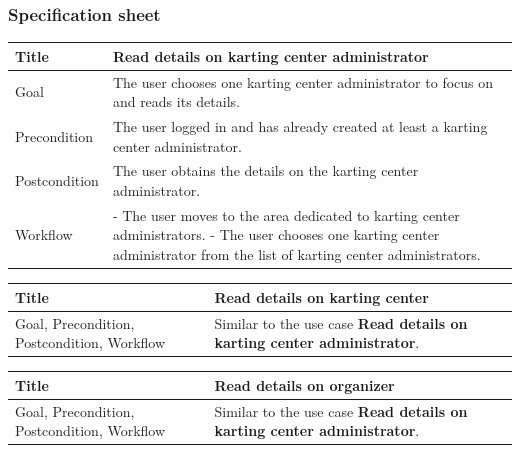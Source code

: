 \documentclass{beamer}
\begin{document}
\begin{frame}
    \frametitle{Specification sheet}
    \begin{table}
        \tiny
        \begin{tabular}{|p{2cm}|p{6cm}|}
        \hline  
        Title & \textbf{Read details on karting center administrator} \\
        \hline
        Goal & The user chooses one karting center administrator to focus on and reads its details. \\
        \hline
        Precondition & The user logged in and has already created at least a karting center 
        administrator. \\
        \hline
        Postcondition & The user obtains the details on the karting center administrator. \\
        \hline
        Workflow &
        - The user moves to the area dedicated to karting center administrators. \newline
        - The user chooses one karting center administrator from the 
        list of karting center administrators. \\
        \hline
        \end{tabular}
\end{table}

\begin{table}
    \tiny
    \begin{tabular}{|p{2cm}|p{6cm}|}
    \hline  
    Title & \textbf{Read details on karting center} \\
    \hline
    Goal, Precondition, Postcondition, Workflow & Similar 
    to the use case \textbf{Read details on karting center administrator}. \\
    \hline
    \end{tabular}
\end{table}

\begin{table}
    \tiny
    \begin{tabular}{|p{2cm}|p{6cm}|}
    \hline  
    Title & \textbf{Read details on organizer} \\
    \hline
    Goal, Precondition, Postcondition, Workflow & Similar 
    to the use case \textbf{Read details on karting center administrator}. \\
    \hline
    \end{tabular}
\end{table}

\end{frame}
\end{document}
